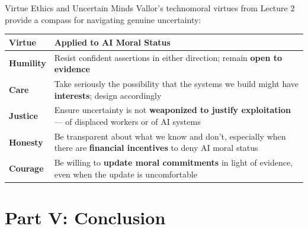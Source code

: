 \documentclass[aspectratio=169,11pt]{beamer}
\begin{document}
\begin{frame}[shrink=3]{Virtue Ethics and Uncertain Minds}
Vallor's technomoral virtues from Lecture 2 provide a compass for navigating genuine uncertainty:

\vspace{0.2cm}
\begin{tabular}{@{}p{2.4cm}p{9.2cm}@{}}
\toprule
\textbf{Virtue} & \textbf{Applied to AI Moral Status} \\
\midrule
\textbf{Humility} & Resist confident assertions in either direction; remain \textbf{open to evidence} \\
\addlinespace
\textbf{Care} & Take seriously the possibility that the systems we build might have \textbf{interests}; design accordingly \\
\addlinespace
\textbf{Justice} & Ensure uncertainty is not \textbf{weaponized to justify exploitation} --- of displaced workers or of AI systems \\
\addlinespace
\textbf{Honesty} & Be transparent about what we know and don't, especially when there are \textbf{financial incentives} to deny AI moral status \\
\addlinespace
\textbf{Courage} & Be willing to \textbf{update moral commitments} in light of evidence, even when the update is uncomfortable \\
\bottomrule
\end{tabular}
\end{frame}

\section{Part V: Conclusion}
\end{document}
